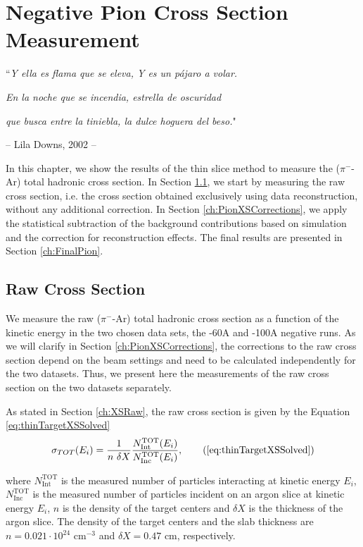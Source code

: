 \chapter{Negative Pion Cross Section Measurement}\label{ch:PionXS}
{\raggedleft ``\emph{Y ella es flama que se eleva, Y es un p\'ajaro a volar.} \par}
{\raggedleft \emph{En la noche que se incendia, estrella de oscuridad}\par}
{\raggedleft \emph{que busca entre la tiniebla, la dulce hoguera del beso.}"\par}
{\raggedleft -- Lila Downs,   2002 -- \par}%
\vspace{0.5cm}

In this chapter, we show the results of the thin slice method to measure 
the ($\pi^-$-Ar) total hadronic cross section. In Section \ref{ch:PionXSRaw}, we start by measuring the raw cross section, i.e. the cross section obtained exclusively using data reconstruction, without any additional correction. In Section \ref{ch:PionXSCorrections}, we apply the statistical subtraction of the background contributions based on simulation and the correction for reconstruction effects. The final results are presented in Section \ref{ch:FinalPion}.


\section{Raw Cross Section}\label{ch:PionXSRaw}
We measure the raw ($\pi^-$-Ar) total hadronic cross section as a function of the kinetic energy in the two chosen data sets, the -60A and -100A negative runs. 
As we will clarify in Section \ref{ch:PionXSCorrections},  the corrections to the raw cross section depend on the beam settings and need to be calculated independently for the two datasets. Thus, we present here the measurements of the raw cross section on the two datasets separately.


As stated in Section \ref{ch:XSRaw},  the raw cross section is given by the Equation \ref{eq:thinTargetXSSolved}
\begin{equation}
 \sigma_{TOT} (E_i)  = \frac{1}{n\text{ } \delta X}\frac{N^{\text{TOT}}_{\text{Int}}(E_i)}{N^{\text{TOT}}_{\text{Inc}}(E_i)},  \tag{\ref{eq:thinTargetXSSolved}}
\end{equation}

where $N^{\text{TOT}}_{\text{Int}}$  is the measured number of particles interacting at kinetic energy $E_i$, $N^{\text{TOT}}_{\text{Inc}}$ is the  measured  number of particles incident  on an argon slice at  kinetic energy $E_i$,  $n$ is the density of the target centers  and $\delta X$ is the thickness of the argon slice. The density of the target centers and the slab thickness are $n = 0.021\cdot10^{24} \text{ cm}^{-3} $ and  $\delta X=0.47\text{ cm}$, respectively.


